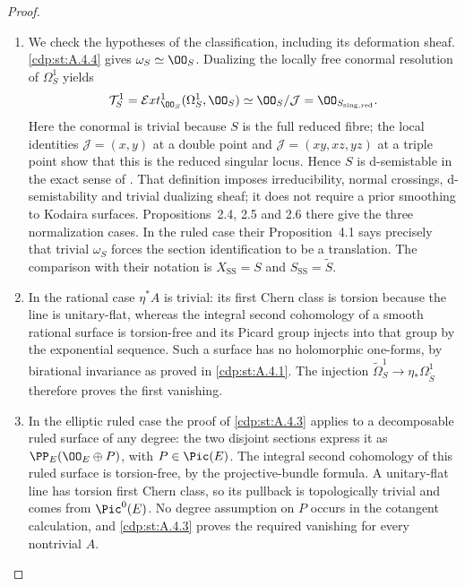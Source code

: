 \begin{proof}

\begin{enumerate}[label={$\langle1\rangle$\arabic*.},leftmargin=*]
\item We check the hypotheses of the classification, including its deformation sheaf. \ref{cdp:st:A.4.4} gives $\omega_S\simeq\OO_S$. Dualizing the locally free conormal resolution of $\Omega_S^1$ yields
\[
 \mathcal T^1_S=\mathcal Ext^1_{\OO_S}(\Omega_S^1,\OO_S)
 \simeq\OO_S/\mathcal J=\OO_{S_{\rm sing,red}}.
\]
Here the conormal is trivial because $S$ is the full reduced fibre; the local identities $\mathcal J=(x,y)$ at a double point and $\mathcal J=(xy,xz,yz)$ at a triple point show that this is the reduced singular locus. Hence $S$ is d-semistable in the exact sense of \cite[Definition~2.1]{SS2002}. That definition imposes irreducibility, normal crossings, d-semistability and trivial dualizing sheaf; it does not require a prior smoothing to Kodaira surfaces. Propositions~2.4, 2.5 and 2.6 there give the three normalization cases. In the ruled case their Proposition~4.1 says precisely that trivial $\omega_S$ forces the section identification to be a translation. The comparison with their notation is $X_{\mathrm{SS}}=S$ and $S_{\mathrm{SS}}=\widetilde S$.

\item In the rational case $\eta^*A$ is trivial: its first Chern class is torsion because the line is unitary-flat, whereas the integral second cohomology of a smooth rational surface is torsion-free and its Picard group injects into that group by the exponential sequence. Such a surface has no holomorphic one-forms, by birational invariance as proved in \ref{cdp:st:A.4.1}. The injection $\widetilde\Omega_S^1\to\eta_*\Omega^1_{\widetilde S}$ therefore proves the first vanishing.

\item In the elliptic ruled case the proof of \ref{cdp:st:A.4.3} applies to a decomposable ruled surface of any degree: the two disjoint sections express it as $\PP_E(\OO_E\oplus P)$, with $P\in\Pic(E)$. The integral second cohomology of this ruled surface is torsion-free, by the projective-bundle formula. A unitary-flat line has torsion first Chern class, so its pullback is topologically trivial and comes from $\Pic^0(E)$. No degree assumption on $P$ occurs in the cotangent calculation, and \ref{cdp:st:A.4.3} proves the required vanishing for every nontrivial $A$.


\end{enumerate}
\end{proof}
